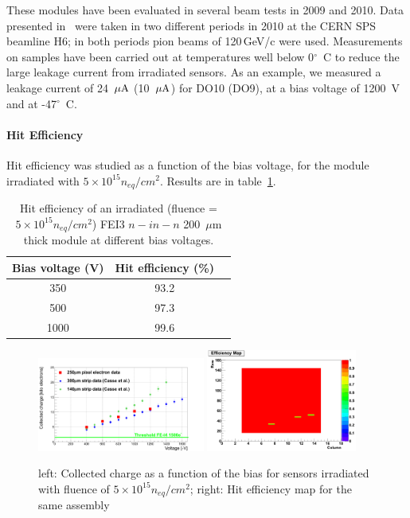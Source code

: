 These modules have been evaluated in several beam tests in 2009 and 2010.
Data presented in~\cite{1748-0221-7-10-P10028}  were taken in two different periods in 2010 at the CERN 
SPS beamline H6; in both periods pion beams of 120\,GeV/c were used.
Measurements on  samples have been carried out at temperatures well
below 0$^{\circ}$~C to reduce the large leakage current from irradiated
sensors. As an example, we measured a leakage current of 24~${\rm \mu A}$
 (10~${\rm \mu A}$) for DO10 (DO9), at a bias voltage of 1200~V and at
 -47$^{\circ}$~C.

\paragraph{Hit Efficiency}

Hit efficiency was studied as a function of the bias voltage, for the
module irradiated with $5\times 10^{15} n_{eq}/cm^{2}$.
Results are in table~\ref{tab:n-eff}.

\begin{table}[!htb]
\caption{\label{tab:n-eff}Hit efficiency of an irradiated (fluence = $5\times 10^{15} n_{eq}/cm^{2}$)
FEI3 $n-in-n$ 200~$\mu$m thick module at different bias voltages.}
\begin{center}
\begin{tabular}{|c|c|c|}
\hline
Bias voltage (V) & Hit efficiency (\%) \\
\hline
350 & 93.2 \\
\hline
500 & 97.3 \\
\hline
1000 & 99.6 \\
\hline
\end{tabular}
\end{center}

\end{table}

\begin{figure}[!htb]
\begin{center}
\includegraphics[width=0.49\textwidth]{5E15_onlyElectrons.png}
\includegraphics[width=0.44\textwidth]{EffMap_DO13_1000V.png}
\end{center}
\caption{\label{fig:5e15}left: Collected charge as a function of the bias for sensors irradiated
with fluence of $5\times 10^{15} n_{eq}/cm^{2}$; right: Hit efficiency map for the same assembly}
\end{figure}

